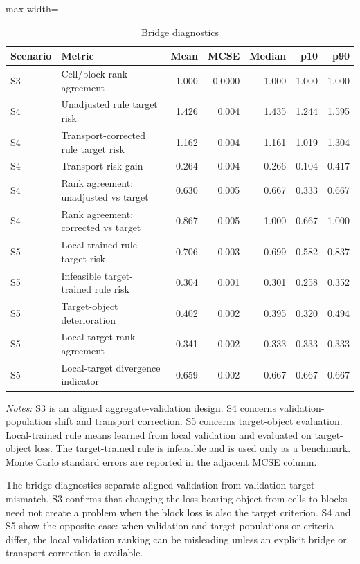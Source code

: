 \documentclass[a4paper,12pt]{article}
\newcommand{\1}{\mathbf{1}}
\newcommand{\ExhibitNote}[1]{\begin{minipage}{0.94\textwidth}\footnotesize\emph{Notes:} #1\end{minipage}}
\begin{document}
\begin{table}[H]
\centering
\caption{Bridge diagnostics}
\label{tab:ia_mc_bridge}
\scriptsize
\begin{adjustbox}{max width=\textwidth}
\begin{tabular}{@{}llrrrrr@{}}
\toprule
Scenario & Metric & Mean & MCSE & Median & p10 & p90 \\
\midrule
S3 & Cell/block rank agreement & 1.000 & 0.0000 & 1.000 & 1.000 & 1.000 \\
S4 & Unadjusted rule target risk & 1.426 & 0.004 & 1.435 & 1.244 & 1.595 \\
S4 & Transport-corrected rule target risk & 1.162 & 0.004 & 1.161 & 1.019 & 1.304 \\
S4 & Transport risk gain & 0.264 & 0.004 & 0.266 & 0.104 & 0.417 \\
S4 & Rank agreement: unadjusted vs target & 0.630 & 0.005 & 0.667 & 0.333 & 0.667 \\
S4 & Rank agreement: corrected vs target & 0.867 & 0.005 & 1.000 & 0.667 & 1.000 \\
S5 & Local-trained rule target risk & 0.706 & 0.003 & 0.699 & 0.582 & 0.837 \\
S5 & Infeasible target-trained rule risk & 0.304 & 0.001 & 0.301 & 0.258 & 0.352 \\
S5 & Target-object deterioration & 0.402 & 0.002 & 0.395 & 0.320 & 0.494 \\
S5 & Local-target rank agreement & 0.341 & 0.002 & 0.333 & 0.333 & 0.333 \\
S5 & Local-target divergence indicator & 0.659 & 0.002 & 0.667 & 0.667 & 0.667 \\
\bottomrule
\end{tabular}
\end{adjustbox}
\par\medskip
\ExhibitNote{S3 is an aligned aggregate-validation design. S4 concerns validation-population shift and transport correction. S5 concerns target-object evaluation. Local-trained rule means learned from local validation and evaluated on target-object loss. The target-trained rule is infeasible and is used only as a benchmark. Monte Carlo standard errors are reported in the adjacent MCSE column.}
\end{table}

The bridge diagnostics separate aligned validation from validation-target mismatch. S3 confirms that changing the loss-bearing object from cells to blocks need not create a problem when the block loss is also the target criterion. S4 and S5 show the opposite case: when validation and target populations or criteria differ, the local validation ranking can be misleading unless an explicit bridge or transport correction is available.
\end{document}

